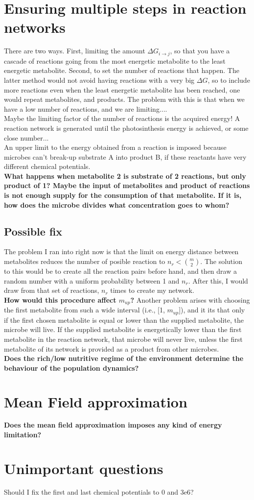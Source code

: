 \documentclass[12pt]{article}
\begin{document}
	\section{Ensuring multiple steps in reaction networks}
	There are two ways. First, limiting the amount $ \Delta G_{i\rightarrow j} $, so that you have a cascade of reactions going from the most energetic metabolite to the least energetic metabolite. Second, to set the number of reactions that happen. The latter method would not avoid having reactions with a very big $ \Delta G $, so to include more reactions even when the least energetic metabolite has been reached, one would repeat metabolites, and products. The problem with this is that when we have a low number of reactions, and we are limiting....\\
	Maybe the limiting factor of the number of reactions is the acquired energy! A reaction network is generated until the photosinthesis energy is achieved, or some close number... \\
	An upper limit to the energy obtained from a reaction is imposed because microbes  can't break-up substrate A into product B, if these reactants have very different chemical potentials. \\
	\textbf{What happens when metabolite 2 is substrate of 2 reactions, but only product of 1? Maybe the input of metabolites and product of reactions is not enough supply for the consumption of that metabolite. If it is, how does the microbe divides what concentration goes to whom?}
	\subsection{Possible fix}
	The problem I ran into right now is that the limit on energy distance between metabolites reduces the number of posible reaction to $ n_r < {m \choose 2} $. The solution to this would be to create all the reaction pairs before hand, and then draw a random number with a uniform probability between 1 and $ n_r $. After this, I would draw from that set of reactions, $ n_r  $ times to create my network.\\
	\textbf{How would this procedure affect $ m_{up} $?}
	Another problem arises with choosing the first metabolite from such a wide interval (i.e., [1, $ m_{up} $]), and it its that only if the first chosen metabolite is equal or lower than the supplied metabolite, the microbe will live. If the supplied metabolite is energetically lower than the first metabolite in the reaction network, that microbe will never live, unless the first metabolite of its network is provided as a product from other microbes.\\ 
	\textbf{Does the rich/low nutritive regime of the environment determine the behaviour of the population dynamics?}\\
	\section{Mean Field approximation}
	\textbf{Does the mean field approximation imposes any kind of energy limitation?}
	\section{Unimportant questions}
	Should I fix the first and last chemical potentials to 0 and 3e6?
\end{document}
